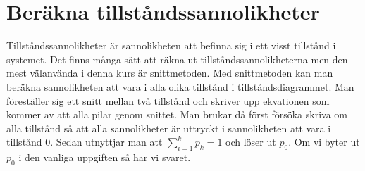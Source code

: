 \documentclass{article}
\begin{document}
	\section*{Beräkna tillståndssannolikheter}
	Tillståndssannolikheter är sannolikheten att befinna sig i ett visst tillstånd i systemet. Det finns många sätt att räkna ut tillståndssannolikheterna men den mest välanvända i denna kurs är snittmetoden. Med snittmetoden kan man beräkna sannolikheten att vara i alla olika tillstånd i tillståndsdiagrammet. Man föreställer sig ett snitt mellan två tillstånd och skriver upp ekvationen som kommer av att alla pilar genom snittet. Man brukar då först försöka skriva om alla tillstånd så att alla sannolikheter är uttryckt i sannolikheten att vara i tillstånd 0. Sedan utnyttjar man att $\sum_{i=1}^{k}p_k = 1$ och löser ut $p_0$. Om vi byter ut $p_0$ i den vanliga uppgiften så har vi svaret.
\end{document}
